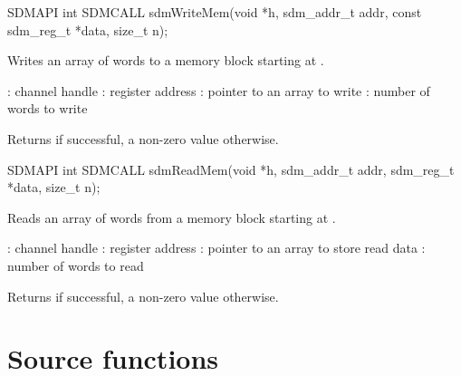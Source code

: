 \documentclass[a4paper,12pt,twoside,extrafontsizes]{memoir}
\begin{document}


\begin{cfuncprototype}
SDMAPI int SDMCALL sdmWriteMem(void *h, sdm_addr_t addr, const sdm_reg_t *data, size_t n);
\end{cfuncprototype}

\begin{funcdescr}
	Writes an array of words to a memory block starting at .
\end{funcdescr}

\begin{funcparams}
	: channel handle
	: register address
	: pointer to an array to write
	: number of words to write
\end{funcparams}

\begin{funcret}
	Returns  if successful, a non-zero value otherwise.
\end{funcret}



\begin{cfuncprototype}
SDMAPI int SDMCALL sdmReadMem(void *h, sdm_addr_t addr, sdm_reg_t *data, size_t n);
\end{cfuncprototype}

\begin{funcdescr}
	Reads an array of words from a memory block starting at .
\end{funcdescr}

\begin{funcparams}
	: channel handle
	: register address
	: pointer to an array to store read data
	: number of words to read
\end{funcparams}

\begin{funcret}
	Returns  if successful, a non-zero value otherwise.
\end{funcret}

\section{Source functions}
\label{sec:sourcefunctions}
\end{document}
